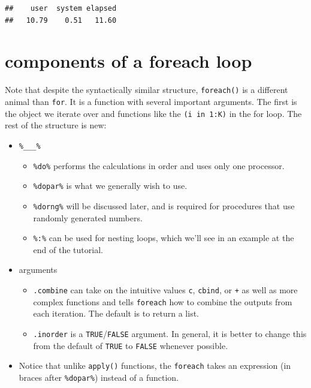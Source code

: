 \documentclass[]{article}
\begin{document}
\begin{verbatim}
##    user  system elapsed 
##   10.79    0.51   11.60
\end{verbatim}

\section{components of a foreach
loop}\label{components-of-a-foreach-loop}

Note that despite the syntactically similar structure,
\texttt{foreach()} is a different animal than \texttt{for}. It is a
function with several important arguments. The first is the object we
iterate over and functions like the \texttt{(i in 1:K)} in the for loop.
The rest of the structure is new:

\begin{itemize}
\itemsep1pt\parskip0pt
\item
  \texttt{\%\_\_\_\%}

  \begin{itemize}
  \itemsep1pt\parskip0pt
  \item
    \texttt{\%do\%} performs the calculations in order and uses only one
    processor.
  \item
    \texttt{\%dopar\%} is what we generally wish to use.
  \item
    \texttt{\%dorng\%} will be discussed later, and is required for
    procedures that use randomly generated numbers.
  \item
    \texttt{\%:\%} can be used for nesting loops, which we'll see in an
    example at the end of the tutorial.
  \end{itemize}
\item
  arguments

  \begin{itemize}
  \itemsep1pt\parskip0pt
  \item
    \texttt{.combine} can take on the intuitive values
    \texttt{\textquotesingle{}c\textquotesingle{}},
    \texttt{\textquotesingle{}cbind\textquotesingle{}}, or
    \texttt{\textquotesingle{}+\textquotesingle{}} as well as more
    complex functions and tells \texttt{foreach} how to combine the
    outputs from each iteration. The default is to return a list.
  \item
    \texttt{.inorder} is a \texttt{TRUE}/\texttt{FALSE} argument. In
    general, it is better to change this from the default of
    \texttt{TRUE} to \texttt{FALSE} whenever possible.
  \end{itemize}
\item
  Notice that unlike \texttt{apply()} functions, the \texttt{foreach}
  takes an expression (in braces after \texttt{\%dopar\%}) instead of a
  function.
\end{itemize}
\end{document}
